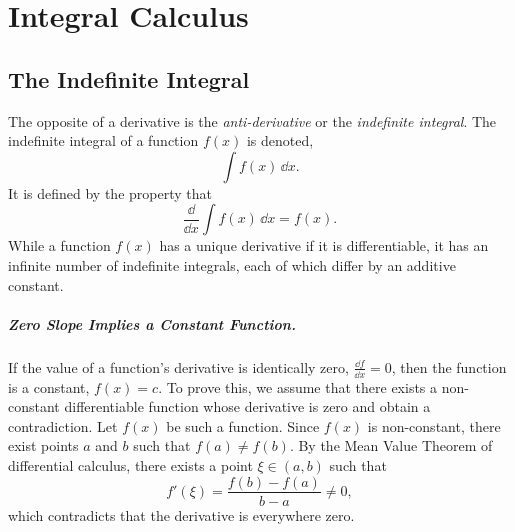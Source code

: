 
\flushbottom






\chapter{Integral Calculus}
\label{chapter_integral}



\section{The Indefinite Integral}

The opposite of a derivative is the \textit{anti-derivative} or the
\textit{indefinite integral}.  The indefinite integral of a function
$f(x)$ is denoted,
\[
\int f(x) \,\dd x.
\]
It is defined by the property that
\[
\frac{\dd}{\dd x} \int f(x) \,\dd x = f(x).
\]
While a function $f(x)$ has a unique derivative if it is differentiable, it
has an infinite number of indefinite integrals, each of which differ by
an additive constant.

\paragraph{Zero Slope Implies a Constant Function.}
If the value of a function's derivative is identically zero, 
$\frac{\dd f}{\dd x} = 0$, then the function is a constant, $f(x) = c$.
To prove this, we assume that there exists a non-constant differentiable
function whose derivative is zero and obtain a contradiction.  Let
$f(x)$ be such a function.  Since $f(x)$ is non-constant, there exist
points $a$ and $b$ such that $f(a) \neq f(b)$.  By the Mean Value 
Theorem of differential calculus, there exists a point $\xi \in (a,b)$
such that
\[
f'(\xi) = \frac{f(b) - f(a)}{b-a} \neq 0,
\]
which contradicts that the derivative is everywhere zero.


